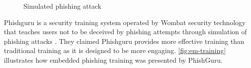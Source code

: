 \begin{figure}[H]

\quad{}\quad{}\protect\caption{\label{fig:simulated}Simulated phishing attack \citep{kumaraguru:2009}}


\end{figure}


Phishguru is a security training system operated by Wombat security
technology that teaches users not to be deceived by phishing attempts
through simulation of phishing attacks \citep{phishguru}. They claimed
Phishguru provides more effective training than traditional training
as it is designed to be more engaging. \autoref{fig:em-training}
illustrates how embedded phishing training was presented by PhishGuru.

